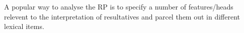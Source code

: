 \documentclass[MilwayThesis]{subfiles}
\begin{document}
A popular way to analyse the RP is to specify a number of features/heads relevent to the interpretation of resultatives \parencite[\textit{e.g.}, \textit{init}, \textit{proc}, and \textit{res} for][]{ramchand2008verb} and parcel them out in different lexical items.
\end{document}
